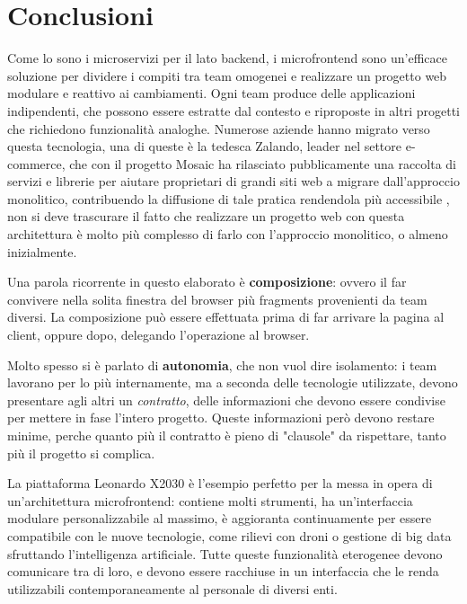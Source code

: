 \chapter{Conclusioni}\label{ch:conclusioni}
Come lo sono i microservizi per il lato backend, i microfrontend sono un'efficace soluzione per dividere i compiti tra team omogenei
e realizzare un progetto web modulare e reattivo ai cambiamenti. Ogni team produce delle applicazioni indipendenti, 
che possono essere estratte dal contesto e riproposte in altri progetti che richiedono funzionalità analoghe.
Numerose aziende hanno migrato verso questa tecnologia, una di queste è la tedesca Zalando, leader nel settore e-commerce, che con
il progetto Mosaic ha rilasciato pubblicamente una raccolta di servizi e librerie per aiutare proprietari di grandi siti web a migrare 
dall'approccio monolitico, contribuendo la diffusione di tale pratica rendendola più accessibile \cite{mosaic}, non si deve trascurare il fatto che 
realizzare un progetto web con questa architettura è molto più complesso di farlo con l'approccio monolitico, o almeno inizialmente.

Una parola ricorrente in questo elaborato è \textbf{composizione}: ovvero il far convivere nella solita finestra del browser
più fragments provenienti da team diversi. La composizione può essere effettuata prima di far arrivare la pagina al client, oppure
dopo, delegando l'operazione al browser.

Molto spesso si è parlato di \textbf{autonomia}, che non vuol dire isolamento: i team lavorano per lo più internamente, ma 
a seconda delle tecnologie utilizzate, devono presentare agli altri un \emph{contratto}, delle informazioni che devono essere condivise
per mettere in fase l'intero progetto. Queste informazioni però devono restare minime, 
perche quanto più il contratto è pieno di "clausole" da rispettare, tanto più il progetto si complica.

La piattaforma Leonardo X2030 è l'esempio perfetto per la messa in opera di un'architettura microfrontend:
contiene molti strumenti, ha un'interfaccia modulare personalizzabile al massimo, è aggioranta continuamente
per essere compatibile con le nuove tecnologie, come rilievi con droni o gestione di big data sfruttando l'intelligenza artificiale.
Tutte queste funzionalità eterogenee devono comunicare tra di loro, e devono essere racchiuse in un interfaccia che le
renda utilizzabili contemporaneamente al personale di diversi enti.
